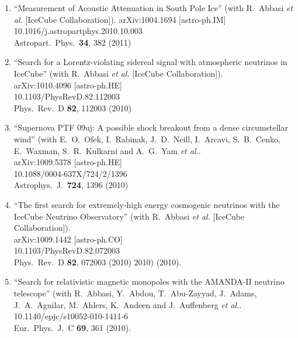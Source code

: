 \begin{enumerate}
\item ``Measurement of Acoustic Attenuation in South Pole
        Ice'' (with R.~Abbasi {\it et al.}  [IceCube
        Collaboration]). arXiv:1004.1694 [astro-ph.IM]
        \\{}10.1016/j.astropartphys.2010.10.003
        \\{}Astropart.\ Phys.\ {\bf     34}, 382 (2011)

\item ``Search for a Lorentz-violating sidereal signal with
        atmospheric   neutrinos in IceCube'' (with R.~Abbasi
        {\it et al.}  [IceCube     Collaboration]).
        \\{}arXiv:1010.4096 [astro-ph.HE]
        \\{}10.1103/PhysRevD.82.112003 \\{}Phys.\ Rev.\ D
        {\bf 82}, 112003   (2010) %

\item ``Supernova PTF 09uj: A possible shock breakout from a
        dense   circumstellar wind'' (with E.~O.~Ofek,
        I.~Rabinak, J.~D.~Neill,   I.~Arcavi, S.~B.~Cenko,
        E.~Waxman, S.~R.~Kulkarni and A.~G.~Yam {\it
        {\it et al.}}.  \\{}arXiv:1009.5378 [astro-ph.HE]
        \\{}10.1088/0004-637X/724/2/1396 \\{}Astrophys.\ J.\
        {\bf 724}, 1396   (2010) %

\item ``The first search for extremely-high energy
        cosmogenic neutrinos with   the IceCube Neutrino
        Observatory'' (with R.~Abbasi {\it et al.}
        [IceCube Collaboration]).  \\{}arXiv:1009.1442
        [astro-ph.CO]   \\{}10.1103/PhysRevD.82.072003
        \\{}Phys.\ Rev.\ D {\bf 82}, 072003   (2010) %
        2010)  (2010).

\item ``Search for relativistic magnetic monopoles with the
        AMANDA-II   neutrino telescope'' (with R.~Abbasi,
        Y.~Abdou, T.~Abu-Zayyad,   J.~Adams, J.~A.~Aguilar,
        M.~Ahlers, K.~Andeen and J.~Auffenberg {\it     {\it
        et al.}}.  \\{}10.1140/epjc/s10052-010-1411-6
        \\{}Eur.\ Phys.\ J.\ C {\bf 69}, 361 (2010).


\end{enumerate}
